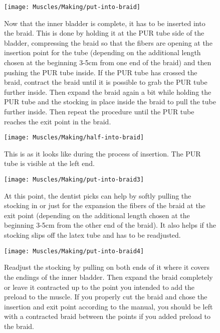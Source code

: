 \documentclass[main]{subfiles}
\begin{document}
\begin{figure}[H]
\centering
\texttt{[image: Muscles/Making/put-into-braid]}
\caption[Inserting the inner bladder into the braid]{Now that the inner bladder is complete, it has to be inserted into the braid. This is done by holding it at the PUR tube side of the bladder, compressing the braid so that the fibers are opening at the insertion point for the tube (depending on the additional length chosen at the beginning 3-5cm from one end of the braid) and then pushing the PUR tube inside. If the PUR tube has crossed the braid, contract the braid until it is possible to grab the PUR tube further inside. Then expand the braid again a bit while holding the PUR tube and the stocking in place inside the braid to pull the tube further inside. Then repeat the procedure until the PUR tube reaches the exit point in the braid. }
\label{put-into-braid}
\end{figure}

\begin{figure}[H]
\centering
\texttt{[image: Muscles/Making/half-into-braid]}
\caption[Bladder during insertion into braid]{This is as it looks like during the process of insertion. The PUR tube is visible at the left end.}
\label{half-into-braid}
\end{figure}

\begin{figure}[H]
\centering
\texttt{[image: Muscles/Making/put-into-braid3]}
\caption[Inserting the inner bladder into the braid 2]{At this point, the dentist picks can help by softly pulling the stocking in or just for the expansion the fibers of the braid at the exit point (depending on the additional length chosen at the beginning 3-5cm from the other end of the braid). It also helps if the stocking slips off the latex tube and has to be readjusted.}
\label{put-into-braid3}
\end{figure}

\begin{figure}[H]
\centering
\texttt{[image: Muscles/Making/put-into-braid4]}
\caption[Inserting the inner bladder into the braid 3]{Readjust the stocking by pulling on both ends of it where it covers the endings of the inner bladder. Then expand the braid completely or leave it contracted up to the point you intended to add the preload to the muscle. If you properly cut the braid and chose the insertion and exit point according to the manual, you should be left with a contracted braid between the points if you added preload to the braid.}
\label{put-into-braid4}
\end{figure}
\end{document}
